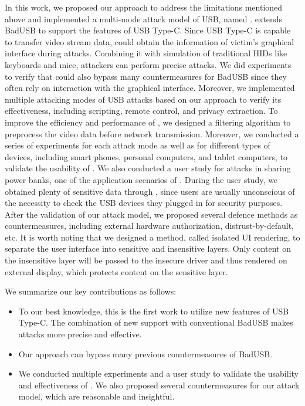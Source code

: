In this work, we proposed our approach to address the limitations mentioned above and implemented a multi-mode attack model of USB, named \tool.
\tool extends BadUSB to support the features of USB Type-C.
Since USB Type-C is capable to transfer video stream data, \tool could obtain the information of victim's graphical interface during attacks.
Combining it with simulation of traditional HIDs like keyboards and mice, attackers can perform precise attacks.
We did experiments to verify that \tool could also bypass many countermeasures for BadUSB since they often rely on interaction with the graphical interface.
Moreover, we implemented multiple attacking modes of USB attacks based on our approach to verify its effectiveness, including scripting, remote control, and privacy extraction.
To improve the efficiency and performance of \tool, we designed a filtering algorithm to preprocess the video data before network transmission.
Moreover, we conducted a series of experiments for each attack mode as well as for different types of devices, including smart phones, personal computers, and tablet computers, to validate the usability of \tool.
We also conducted a user study for attacks in sharing power banks, one of the application scenarios of \tool.
During the user study, we obtained plenty of sensitive data through \tool, since users are usually unconscious of the necessity to check the USB devices they plugged in for security purposes.
After the validation of our attack model, we proposed several defence methods as countermeasures, including external hardware authorization, distrust-by-default, etc.
It is worth noting that we designed a method, called isolated UI rendering, to separate the user interface into sensitive and insensitive layers.
Only content on the insensitive layer will be passed to the insecure driver and thus rendered on external display, which protects content on the sensitive layer.

We summarize our key contributions as follows:
\begin{itemize}
	\item To our best knowledge, this is the first work to utilize new features of USB Type-C.
	The combination of new support with conventional BadUSB makes attacks more precise and effective.
	\item Our approach can bypass many previous countermeasures of BadUSB.
	\item We conducted multiple experiments and a user study to validate the usability and effectiveness of \tool.
	We also proposed several countermeasures for our attack model, which are reasonable and insightful. 
\end{itemize}

